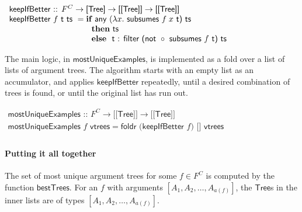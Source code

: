 \begin{EmptyItem}
$\begin{array}{p{3.2cm} l}
\multicolumn{2}{l}{\textsf{keepIfBetter :: } F^C  \rightarrow \textsf{[Tree]} \rightarrow \textsf{[[Tree]]} \rightarrow \textsf{[[Tree]]}} \\
\multicolumn{2}{l}{\textsf{keepIfBetter } f \textsf{ t ts } = \textbf{if } \textsf{any } (\lambda x. \textsf{ subsumes } f \; x \textsf{ t) ts}} \\
  & \textbf{then} \textsf{ ts} \\
  & \textbf{else} \textsf{~~t : filter (not }
    \circ \textsf{ subsumes } f \textsf{ t) ts} \\
\end{array}$
\end{EmptyItem}

The main logic, in $\textsf{mostUniqueExamples}$, is implemented as a
fold over a list of lists of argument trees.
The algorithm starts with an empty list as an accumulator, and applies
$\textsf{keepIfBetter}$ repeatedly, until a desired combination of
trees is found, or until the original list has run out.


\begin{EmptyItem}
$\begin{array}{l}
\textsf{mostUniqueExamples :: } F^C \rightarrow \textsf{[[Tree]]} \rightarrow \textsf{[[Tree]]} \\
\textsf{mostUniqueExamples } f \textsf{ vtrees} = \textsf{foldr (keepIfBetter } f \textsf{) [] vtrees} \\
\end{array}$
\end{EmptyItem}

\paragraph{Putting it all together}
The set of most unique argument trees for some $f \in F^C$
is computed by the function $\textsf{bestTrees}$.
For an $f$ with arguments $[A_1,A_2,\dots,A_{a(f)}]$, the $\textsf{Tree}$s in
the inner lists are of types $[A_1,A_2,\dots,A_{a(f)}]$.

